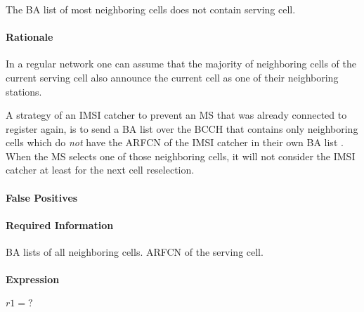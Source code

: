 \documentclass[a4paper,11pt,notitlepage,bigheadings,oneside]{scrartcl}
\begin{document}
\subsubsection{}

The BA list of most neighboring cells does not contain serving cell.

\paragraph{Rationale}

In a regular network one can assume that the majority of neighboring cells of
the current serving cell also announce the current cell as one of their
neighboring stations. 

A strategy of an IMSI catcher to prevent an MS that was already connected to
register again, is to send a BA list over the BCCH that contains only
neighboring cells which do \emph{not} have the ARFCN of the IMSI catcher in
their own BA list \cite[0027]{bott2000verfahren}. When the MS selects one of
those neighboring cells, it will not consider the IMSI catcher at least for the
next cell reselection.

\paragraph{False Positives}


\paragraph{Required Information}

BA lists of all neighboring cells. ARFCN of the serving cell.


\paragraph{Expression}

$r1 = ?$

\subsubsection{}
\end{document}
